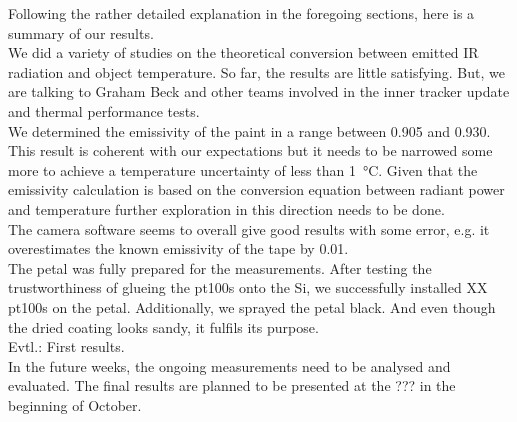 Following the rather detailed explanation in the foregoing sections, here is a summary of our results. \\


We did a variety of studies on the theoretical conversion between emitted IR radiation and object temperature. So far, the results are little satisfying. But, we are talking to Graham Beck and other teams involved in the inner tracker update and thermal performance tests. \\


We determined the emissivity of the paint in a range between 0.905 and 0.930. This result is coherent with our expectations but it needs to be narrowed some more to achieve a temperature uncertainty of less than \SI{1}{\degreeCelsius}. Given that the emissivity calculation is based on the conversion equation between radiant power and temperature further exploration in this direction needs to be done. \\


The camera software seems to overall give good results with some error, e.g. it overestimates the known emissivity of the tape by 0.01. \\


The petal was fully prepared for the measurements. After testing the trustworthiness of glueing the pt100s onto the Si, we successfully installed XX pt100s on the petal. Additionally, we sprayed the petal black. And even though the dried coating looks sandy, it fulfils its purpose. \\


Evtl.: First results. \\


In the future weeks, the ongoing measurements need to be analysed and evaluated. The final results are planned to be presented at the ??? in the beginning of October.